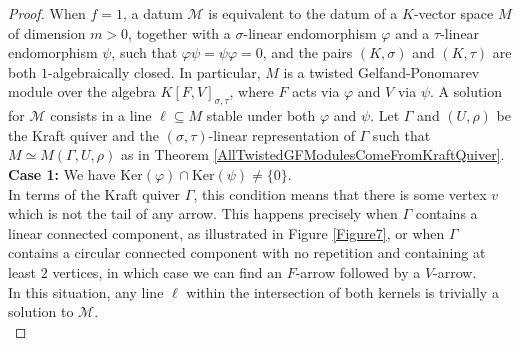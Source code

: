 \documentclass[12pt]{amsart}
\theoremstyle{definition}
\newcommand{\<}{\langle}   %
\renewcommand{\>}{\rangle} %
\begin{document}
\begin{proof}
    When $f=1$, a datum $\mathcal M$ is equivalent to the datum of a $K$-vector space $M$ of dimension $m>0$, together with a $\sigma$-linear endomorphism $\varphi$ and a $\tau$-linear endomorphism $\psi$, such that $\varphi\psi = \psi\varphi = 0$, and the pairs $(K,\sigma)$ and $(K,\tau)$ are both $1$-algebraically closed. In particular, $M$ is a twisted Gelfand-Ponomarev module over the algebra $K[F,V]_{\sigma,\tau}$, where $F$ acts via $\varphi$ and $V$ via $\psi$. A solution for $\mathcal M$ consists in a line $\ell \subseteq M$ stable under both $\varphi$ and $\psi$. Let $\Gamma$ and $(U,\rho)$ be the Kraft quiver and the $(\sigma,\tau)$-linear representation of $\Gamma$ such that $M \simeq M(\Gamma,U,\rho)$ as in Theorem \ref{AllTwistedGFModulesComeFromKraftQuiver}.\\

    \textbf{Case 1:} We have $\mathrm{Ker}(\varphi) \cap \mathrm{Ker}(\psi) \not = \{0\}$.\\ 
    In terms of the Kraft quiver $\Gamma$, this condition means that there is some vertex $v$ which is not the tail of any arrow. This happens precisely when $\Gamma$ contains a linear connected component, as illustrated in Figure \ref{Figure7}, or when $\Gamma$ contains a circular connected component with no repetition and containing at least $2$ vertices, in which case we can find an $F$-arrow followed by a $V$-arrow.\\
    In this situation, any line $\ell$ within the intersection of both kernels is trivially a solution to $\mathcal M$.\\


\end{proof}
\end{document}
